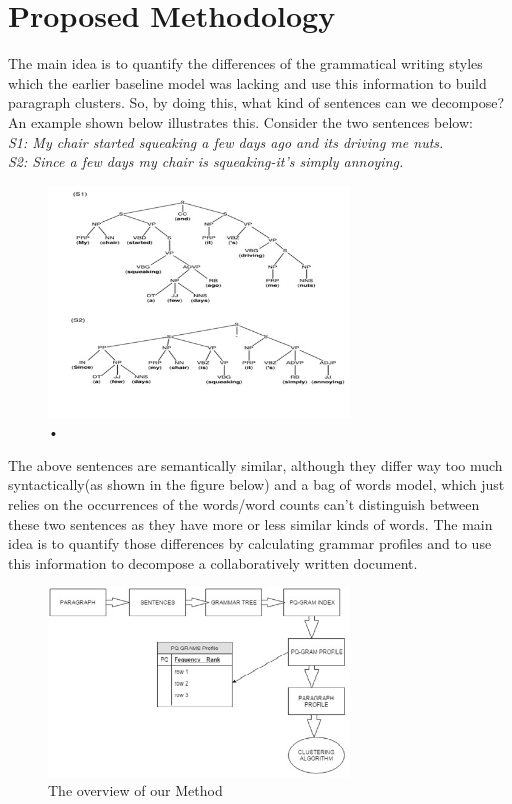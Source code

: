 \documentclass[letterpaper]{article}
\begin{document}
\section{Proposed Methodology}
The main idea is to quantify the differences of the grammatical writing styles which the earlier baseline model was lacking and use this information to build paragraph clusters. So, by doing this, what kind of sentences can we decompose? An example shown below illustrates this. Consider the two sentences below:\\
\textit{S1: My chair started squeaking a few days ago and its driving me nuts.\\
S2: Since a few days my chair is squeaking-it’s simply annoying.\\}
\begin{figure}[H]
\caption{•}
\includegraphics[width=8cm]{u2.jpg}
\end{figure}
The above sentences are semantically similar, although they differ way too much syntactically(as shown in the figure below) and a bag of words model, which just relies on the occurrences of the words/word counts can’t distinguish between these two sentences as they have more or less similar kinds of words. The main idea is to quantify those differences by calculating grammar profiles and to use this information to decompose a collaboratively written document.
\begin{figure}[H]

\caption{The overview of our Method}
\includegraphics[width=8cm]{u3.jpg}

\end{figure}
\end{document}
